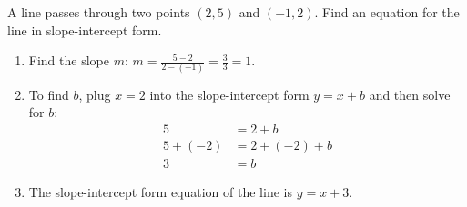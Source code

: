 \begin{tcolorbox}[title={How to write an equation for a line?}]

\begin{example}
 A line passes through two points $(2, 5)$ and $(-1,2)$. Find an equation for the line in slope-intercept form.
\begin{enumerate}[label={\textbf{Step \arabic*.}~}, itemsep=0em, itemindent=1ex]
\item Find the slope $m$: $m=\frac{5-2}{2-(-1)}=\frac{3}{3}=1$. 
\item 
To find $b$, plug $x=2$ into the slope-intercept form $y=x+b$ and then solve for $b$: \vspace*{-0.5em}
\[\begin{split}
5&=2+b\\
5+(-2)&=2+(-2)+b\\
3&=b
\end{split}\]
\vspace*{-2em}
\item The slope-intercept form equation of the line is $y=x+3$.
 \end{enumerate}
\end{example}
\end{tcolorbox}



